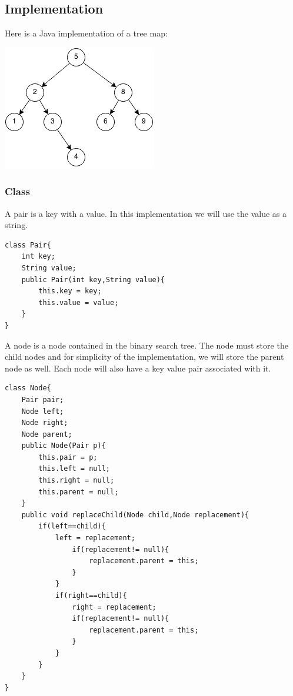 \documentclass[11pt,oneside]{book}
\makeatletter
\def\maxwidth#1{\ifdim\Gin@nat@width>#1 #1\else\Gin@nat@width\fi}
\makeatother
\begin{document}
\subsection{Implementation}

Here is a Java implementation of a tree map:

\vspace{5px}\includegraphics[width=\maxwidth{\textwidth}]{bst.png}

\subsubsection{Class}

A pair is a key with a value. In this implementation we will use the value as a string.

\begin{lstlisting}
class Pair{
    int key;
    String value;
    public Pair(int key,String value){
        this.key = key;
        this.value = value;
    }
}
\end{lstlisting}

A node is a node contained in the binary search tree. The node must store the child nodes and for simplicity of the implementation, we will store the parent node as well. Each node will also have a key value pair associated with it.

\begin{lstlisting}
class Node{
    Pair pair;
    Node left;
    Node right;
    Node parent;
    public Node(Pair p){
        this.pair = p;
        this.left = null;
        this.right = null;
        this.parent = null;
    }
    public void replaceChild(Node child,Node replacement){
        if(left==child){
            left = replacement;
                if(replacement!= null){
                    replacement.parent = this;
                }
            }
            if(right==child){
                right = replacement;
                if(replacement!= null){
                    replacement.parent = this;
                }
            }
        }
    }
}
\end{lstlisting}
\end{document}
